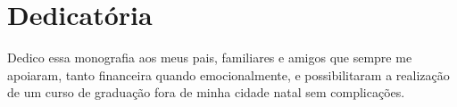 \chapter*{Dedicatória}

Dedico essa monografia aos meus pais, familiares e amigos que sempre me apoiaram, tanto financeira quando emocionalmente, e possibilitaram a realização de um curso de graduação fora de minha cidade natal sem complicações.

